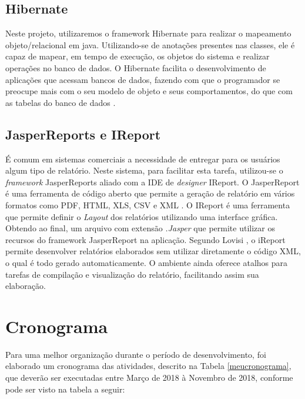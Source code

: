     \subsection{Hibernate}
    Neste projeto, utilizaremos o framework Hibernate para realizar o mapeamento objeto/relacional em java. Utilizando-se de anotações presentes nas classes, ele é capaz de mapear, em tempo de execução, os objetos do sistema e realizar operações no banco de dados.
    O Hibernate facilita o desenvolvimento de aplicações que acessam
bancos de dados, fazendo com que o programador se preocupe mais com o seu modelo de objeto e seus
comportamentos, do que com as tabelas do banco de dados \cite{linhares2012introduccao}.

    \subsection{JasperReports e IReport}
    
    É comum em sistemas comerciais a necessidade de entregar para os usuários algum tipo de relatório. Neste sistema, para facilitar esta tarefa, utilizou-se  o \textit{framework} JasperReports aliado com a IDE de \textit{designer} IReport. 
    O JasperReport é uma ferramenta de código aberto que permite a geração de relatório em vários formatos como PDF, HTML, XLS, CSV e XML \cite{lovisi2011estrategias}.
     O IReport é uma ferramenta que permite definir o \textit{Layout} dos relatórios utilizando uma interface gráfica. Obtendo ao final, um arquivo com extensão \textit{.Jasper} que permite utilizar os recursos do framework JasperReport na aplicação.
        Segundo Lovisi \cite{lovisi2011estrategias}, o iReport permite desenvolver relatórios elaborados sem utilizar diretamente o código XML, o qual é todo gerado automaticamente. O ambiente ainda oferece atalhos para tarefas de compilação e visualização do relatório, facilitando assim sua elaboração.
    

\section{Cronograma}
 
Para uma melhor organização durante o período de desenvolvimento, foi elaborado um cronograma das atividades, descrito na Tabela \ref{meucronograma}, que deverão ser executadas entre Março de 2018 à Novembro de 2018, conforme pode ser visto na tabela a seguir:



